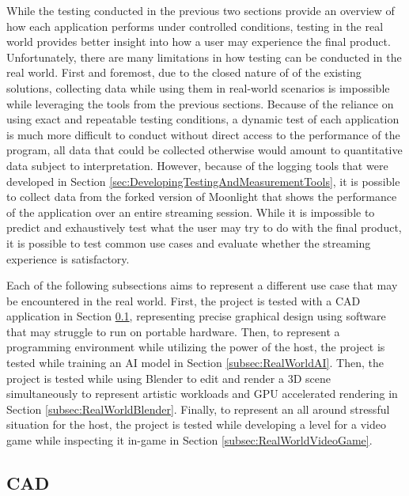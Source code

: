 While the testing conducted in the previous two sections provide an overview of how each application performs under controlled conditions, testing in the real world provides better insight into how a user may experience the final product.
Unfortunately, there are many limitations in how testing can be conducted in the real world.
First and foremost, due to the closed nature of of the existing solutions, collecting data while using them in real-world scenarios is impossible while leveraging the tools from the previous sections.
Because of the reliance on using exact and repeatable testing conditions, a dynamic test of each application is much more difficult to conduct without direct access to the performance of the program, all data that could be collected otherwise would amount to quantitative data subject to interpretation.
However, because of the logging tools that were developed in Section \ref{sec:DevelopingTestingAndMeasurementTools}, it is possible to collect data from the forked version of Moonlight that shows the performance of the application over an entire streaming session.
While it is impossible to predict and exhaustively test what the user may try to do with the final product, it is possible to test common use cases and evaluate whether the streaming experience is satisfactory.

Each of the following subsections aims to represent a different use case that may be encountered in the real world.
First, the project is tested with a CAD application in Section \ref{subsec:RealWorldKiCad}, representing precise graphical design using software that may struggle to run on portable hardware.
Then, to represent a programming environment while utilizing the power of the host, the project is tested while training an AI model in Section \ref{subsec:RealWorldAI}.
Then, the project is tested while using Blender to edit and render a 3D scene simultaneously to represent artistic workloads and GPU accelerated rendering in Section \ref{subsec:RealWorldBlender}.
Finally, to represent an all around stressful situation for the host, the project is tested while developing a level for a video game while inspecting it in-game in Section \ref{subsec:RealWorldVideoGame}.

\subsection{CAD}\label{subsec:RealWorldKiCad}

